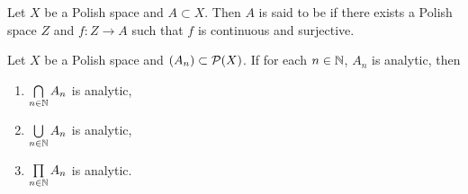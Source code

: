 \documentclass{book}
\begin{document}
	
	\begin{defn} 
		Let $X$ be a Polish space and $A \subset X$. Then $A$ is said to be  if there exists a Polish space $Z$ and $f: Z \rightarrow A$ such that $f$ is continuous and surjective. 
	\end{defn}

	\begin{ex}
		Let $X$ be a Polish space and $(A_n) \subset \mathcal{P}(X)$. If for each $n \in \mathbb{N}$, $A_n$ is analytic, then 
		\begin{enumerate}
			\item $\bigcap\limits_{n \in \mathbb{N}} A_n$ is analytic,
			\item $\bigcup\limits_{n \in \mathbb{N}} A_n$ is analytic,
			\item $\prod\limits_{n \in \mathbb{N}} A_n$ is analytic.
		\end{enumerate}
	\end{ex}
\end{document}
